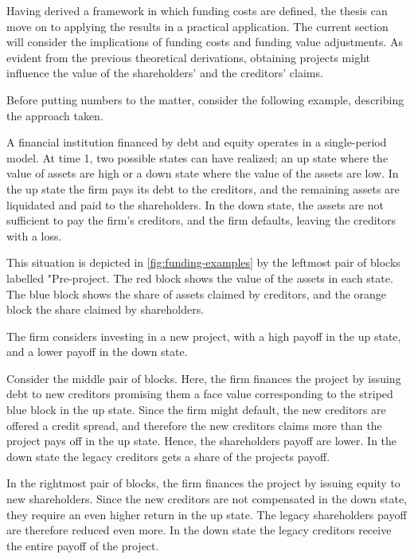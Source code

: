 \documentclass[main.tex]{subfiles}
\begin{document}
    Having derived a framework in which funding costs are defined, 
    the thesis can move on to applying the results in a practical application.
    The current section will consider the implications of funding costs and funding value adjustments.
    As evident from the previous theoretical derivations, 
    obtaining projects might influence the value of the shareholders' and the creditors' claims.

    Before putting numbers to the matter, consider the following example,
    describing the approach taken.

    \begin{example}
    
    A financial institution financed by debt and equity operates in a single-period model.
    At time 1, two possible states can have realized;
    an up state where the value of assets are high
    or a down state where the value of the assets are low.
    In the up state the firm pays its debt to the creditors,
    and the remaining assets are liquidated and paid to the shareholders.
    In the down state, the assets are not sufficient to pay the firm's creditors, 
    and the firm defaults, leaving the creditors with a loss. 

    This situation is depicted in \cref{fig:funding-examples} 
    by the leftmost pair of blocks labelled "Pre-project. 
    The \textcolor{wtf-red}{red block} shows the value of the assets in each state.
    The \textcolor{wtf-blue}{blue block} shows the share of assets claimed by creditors,
    and the \textcolor{wtf-orange}{orange block} the share claimed by shareholders.

    The firm considers investing in a new project, with a high payoff in the up state,
    and a lower payoff in the down state.

    \newcommand{\striped}[2]{%
        \raisebox{-3pt}{%
        \tikz{%
            \draw%
                node[inner sep=0, outer sep=0] {\textcolor{#1}{#2}}%
                node[
                    fill, 
                    pattern=north east lines, 
                    pattern color=white,
                    inner sep=0, outer sep=0,
                ] {\phantom{#2}};}%
        }%
    }

    Consider the middle pair of blocks.
    Here, the firm finances the project by issuing debt to new creditors
    promising them a face value corresponding to the striped blue block in the up state.
    Since the firm might default, the new creditors are offered a credit spread,
    and therefore the new creditors claims more than the project pays off in the up state.
    Hence, the shareholders payoff are lower. 
    In the down state the legacy creditors gets a share of the projects payoff.

    In the rightmost pair of blocks,
    the firm finances the project by issuing equity to new shareholders.
    Since the new creditors are not compensated in the down state,
    they require an even higher return in the up state.
    The legacy shareholders payoff are therefore reduced even more.
    In the down state the legacy creditors receive the entire payoff of the project.
    

    \end{example}
\end{document}
